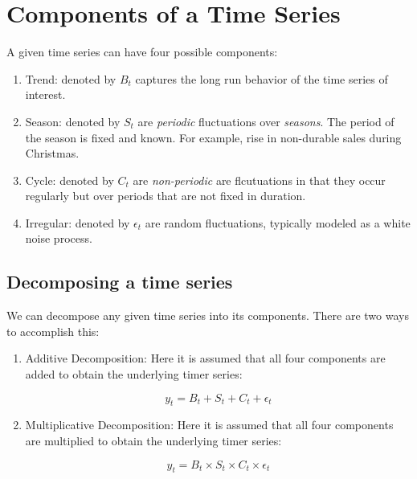 \documentclass[]{book}
\providecommand{\tightlist}{%
  \setlength{\itemsep}{0pt}\setlength{\parskip}{0pt}}
\theoremstyle{definition}
\theoremstyle{definition}
\theoremstyle{definition}
\theoremstyle{remark}
\begin{document}
\chapter{Components of a Time Series}\label{components-of-a-time-series}

A given time series can have four possible components:

\begin{enumerate}
\def\labelenumi{\arabic{enumi}.}
\item
  Trend: denoted by \(B_t\) captures the long run behavior of the time
  series of interest.
\item
  Season: denoted by \(S_t\) are \emph{periodic} fluctuations over
  \emph{seasons}. The period of the season is fixed and known. For
  example, rise in non-durable sales during Christmas.
\item
  Cycle: denoted by \(C_t\) are \emph{non-periodic} are flcutuations in
  that they occur regularly but over periods that are not fixed in
  duration.
\item
  Irregular: denoted by \(\epsilon_t\) are random fluctuations,
  typically modeled as a white noise process.
\end{enumerate}

\section{Decomposing a time series}\label{decomposing-a-time-series}

We can decompose any given time series into its components. There are
two ways to accomplish this:

\begin{enumerate}
\def\labelenumi{\arabic{enumi}.}
\tightlist
\item
  Additive Decomposition: Here it is assumed that all four components
  are added to obtain the underlying timer series:

  \begin{equation}
  y_t= B_t+S_t+C_t +\epsilon_t
  \end{equation}
\item
  Multiplicative Decomposition: Here it is assumed that all four
  components are multiplied to obtain the underlying timer series:

  \begin{equation}
  y_t= B_t \times S_t \times C_t \times \epsilon_t
  \end{equation}
\end{enumerate}
\end{document}
